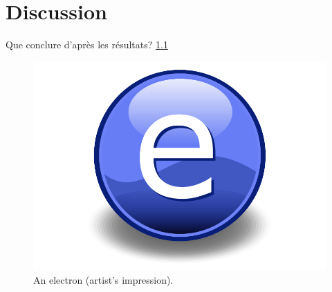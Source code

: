 \chapter{Discussion}
\label{Chap5}
Que conclure d'après les résultats? \ref{fig:Electron}

\begin{figure}[th]
\centering
\includegraphics{Images/Electron}
\decoRule
\caption[An Electron]{An electron (artist's impression).}
\label{fig:Electron}
\end{figure}